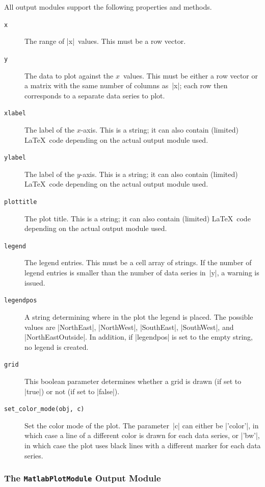 All output modules support the following properties and methods.
\begin{description}
  \item[\texttt{x}] The range of |x|~values. This must be a row vector.
  \item[\texttt{y}] The data to plot against the $x$~values. This must be either
    a row vector or a matrix with the same number of columns as~|x|; each
    row then corresponds to a separate data series to plot.

  \item[\texttt{xlabel}] The label of the $x$-axis. This is a string; it can
    also contain (limited) \LaTeX\ code depending on the actual output module
    used. 
  \item[\texttt{ylabel}] The label of the $y$-axis. This is a string; it can
    also contain (limited) \LaTeX\ code depending on the actual output module
    used.

  \item[\texttt{plottitle}] The plot title. This is a string; it can also
    contain (limited) \LaTeX\ code depending on the actual output module used.

  \item[\texttt{legend}] The legend entries. This must be a cell array of
    strings. If the number of legend entries is smaller than the number of data
    series in~|y|, a warning is issued.

  \item[\texttt{legendpos}] A string determining where in the plot the legend is
    placed. The possible values are |NorthEast|, |NorthWest|, |SouthEast|,
    |SouthWest|, and |NorthEastOutside|. In addition, if |legendpos| is set to
    the empty string, no legend is created.

  \item[\texttt{grid}] This boolean parameter determines whether a grid is drawn
    (if set to |true|) or not (if set to |false|).

  \item[\texttt{set\_color\_mode(obj, c)}] Set the color mode of the plot. The
    parameter~|c| can either be |'color'|, in which case a line of a different
    color is drawn for each data series, or |'bw'|, in which case the plot uses
    black lines with a different marker for each data series.
\end{description}


\subsubsection{The \texttt{MatlabPlotModule} Output Module}

